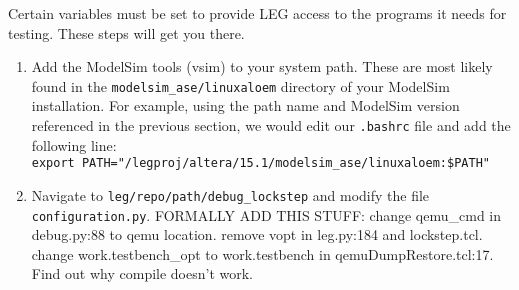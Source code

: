 Certain variables must be set to provide LEG access to the programs it needs for testing.
These steps will get you there.

\begin{enumerate}
\item Add the ModelSim tools (vsim) to your system path.
These are most likely found in the \texttt{modelsim\_ase/linuxaloem} directory of your ModelSim installation.
For example, using the path name and ModelSim version referenced in the previous section, we would edit our \texttt{.bashrc} file and add the following line: \\\texttt{export PATH="/legproj/altera/15.1/modelsim\_ase/linuxaloem:\$PATH"}

\item Navigate to \texttt{leg/repo/path/debug\_lockstep} and modify the file \texttt{config\-uration.py}.
FORMALLY ADD THIS STUFF: change qemu\_cmd in debug.py:88 to qemu location. remove vopt in leg.py:184 and lockstep.tcl. change work.testbench\_opt to work.testbench in qemuDumpRestore.tcl:17. Find out why compile doesn't work.
\end{enumerate}









